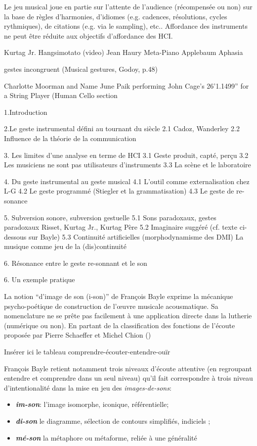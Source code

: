 Le jeu musical joue en partie sur l’attente de l’audience (récompensée ou non) sur la base de règles d'harmonies, d’idiomes (e.g. cadences, résolutions, cycles rythmiques), de citations (e.g. via le sampling), etc..
Affordance des instruments ne peut être réduite aux objectifs d’affordance des HCI.


Kurtag Jr. Hangsimotato (video)
Jean Haury Meta-Piano
Applebaum Aphasia

gestes incongruent (Musical gestures, Godoy, p.48)


Charlotte Moorman and Name June Paik performing John Cage’s 26’1.1499” for a String Player (Human Cello section





1.Introduction

2.Le geste instrumental défini au tournant du siècle
	2.1 Cadoz, Wanderley
	2.2 Influence de la théorie de la communication

3. Les limites d'une analyse en terme de HCI
	3.1 Geste produit, capté, perçu
	3.2 Les musiciens ne sont pas utilisateurs d'instruments
	3.3 La scène et le laboratoire

4. Du geste instrumental au geste musical
	4.1 L'outil comme externalisation chez L-G
	4.2 Le geste programmé (Stiegler et la grammatisation)
	4.3 Le geste de re-sonance

5. Subversion sonore, subversion gestuelle
	5.1 Sons paradoxaux, gestes paradoxaux
		Risset, Kurtag Jr., Kurtag Père
	5.2 Imaginaire suggéré (cf. texte ci-dessous sur Bayle)
	5.3 Continuité artificielles (morphodynamisme des DMI)
		La musique comme jeu de la (dis)continuité

6. Résonance entre le geste re-sonnant et le son

6. Un exemple pratique 



La notion ``d'image de son (i-son)'' de François Bayle exprime la mécanique psycho-poétique de construction de l'œuvre musicale acousmatique. Sa nomenclature  ne se prête pas facilement à une application directe dans la lutherie (numérique ou non).
En partant de la classification des fonctions de l'écoute proposée par Pierre Schaeffer et Michel Chion (\cite{schaeffer Chion Guide objets sonores page 26}) 

Insérer ici le tableau comprendre-écouter-entendre-ouïr

François Bayle retient notamment trois niveaux d'écoute attentive (en regroupant entendre et comprendre dans un seul niveau) qu'il fait correspondre à trois niveau d'intentionalité dans la mise en jeu des \textit{images-de-sons}:
\vspace{-1em}
\begin{itemize}[noitemsep]
\item \textbf{\textit{im-son}}: l'image isomorphe, iconique, référentielle;
\item \textbf{\textit{di-son}} le diagramme, sélection de contours simplifiés, indiciels ;
\item \textbf{\textit{mé-son}} la métaphore ou métaforme, reliée à une généralité
\end{itemize}

